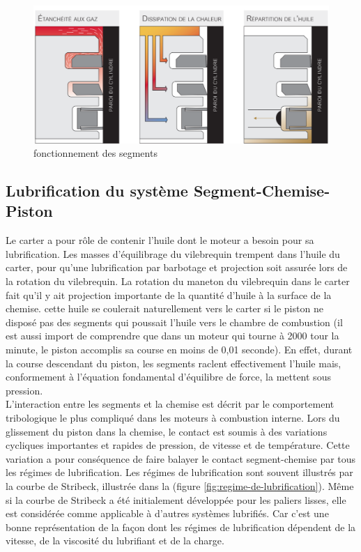 \begin{figure}[h]
	\centering
	\includegraphics[width=0.7\linewidth]{Img/fonction-segment}
	\caption[Segments]{fonctionnement des segments}
	\label{fig:fonction-segment}
\end{figure}

\subsection{Lubrification du système Segment-Chemise-Piston}
Le carter a pour rôle de contenir l'huile dont le moteur a besoin pour sa lubrification. Les masses d'équilibrage du vilebrequin trempent dans l'huile du carter, pour qu'une lubrification par barbotage et projection soit assurée lors de la rotation du vilebrequin. La rotation du maneton du vilebrequin dans le carter fait qu'il y ait projection importante de la quantité d'huile à la surface de la chemise. cette huile se coulerait naturellement vers le carter si le piston ne disposé pas des segments qui poussait l'huile vers le chambre de combustion (il est aussi import de comprendre que dans un moteur qui tourne à 2000 tour la minute, le piston accomplis sa course en moins de 0,01 seconde). En effet, durant la course descendant du piston, les segments raclent effectivement l'huile mais, conformement à l'équation fondamental d'équilibre de force, la mettent sous pression. \\

L'interaction entre les segments et la chemise est décrit par le comportement tribologique le plus compliqué dans les moteurs à combustion interne.\cite{Arup} Lors du glissement du piston dans la chemise, le contact est soumis à des variations cycliques importantes et rapides de pression, de vitesse et de température. Cette variation a pour conséquence de faire balayer le contact segment-chemise par tous les régimes de lubrification. Les régimes de lubrification sont souvent illustrés par la courbe de Stribeck, illustrée dans la (figure \ref{fig:regime-de-lubrification}). Même si la courbe de Stribeck a été initialement développée pour les paliers lisses, elle est considérée comme applicable à d'autres systèmes lubrifiés.\cite{initiation} Car c'est une bonne représentation de la façon dont les régimes de lubrification dépendent de la vitesse, de la viscosité du lubrifiant et de la charge.\\

